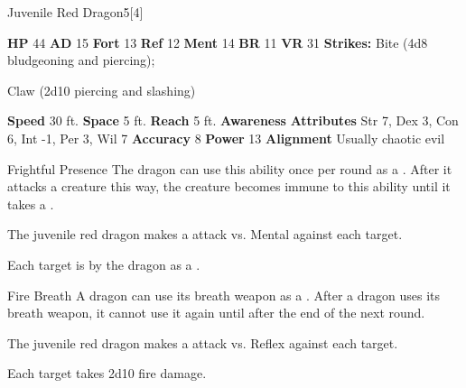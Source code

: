   \begin{monsubsection}{Juvenile Red Dragon}{5}[4]
    \vspace{-1em}\vspace{-1em}
    \vspace{0em}

    
    

    \begin{spellcontent}
      \begin{spelltargetinginfo}
        \pari \textbf{HP} 44 \monsep
          \textbf{AD} 15 \monsep
          \textbf{Fort} 13 \monsep
          \textbf{Ref} 12 \monsep
          \textbf{Ment} 14
        \pari \textbf{BR} 11 \monsep
        \textbf{VR} 31
        \pari \textbf{Strikes:}
            Bite  (4d8 bludgeoning and piercing);
\par Claw  (2d10 piercing and slashing)
      \end{spelltargetinginfo}
    \end{spellcontent}
    \begin{monsterfooter}
      \pari \textbf{Speed} 30 ft. \monsep
        \textbf{Space} 5 ft. \monsep
        \textbf{Reach} 5 ft.
      \pari \textbf{Awareness} 
      \pari \textbf{Attributes}
        Str 7, Dex 3,
        Con 6, Int -1,
        Per 3, Wil 7
      \pari \textbf{Accuracy} 8 \monsep
        \textbf{Power} 13
      \pari \textbf{Alignment} Usually chaotic evil
    \end{monsterfooter}
  \end{monsubsection}
  \begin{freeability}{Frightful Presence}
      The dragon can use this ability once per round as a .
      After it attacks a creature this way, the creature becomes immune to this ability until it takes a .
      \par The juvenile red dragon makes a  attack
        vs. Mental against each target.
    
    \hit Each target is  by the dragon as a .
    \end{freeability}
  

    \begin{freeability}{Fire Breath}
      A dragon can use its breath weapon as a .
      After a dragon uses its breath weapon, it cannot use it again until after the end of the next round.
      \par The juvenile red dragon makes a  attack
        vs. Reflex against each target.
    
    \hit Each target takes 2d10 fire damage.
    \end{freeability}
  
